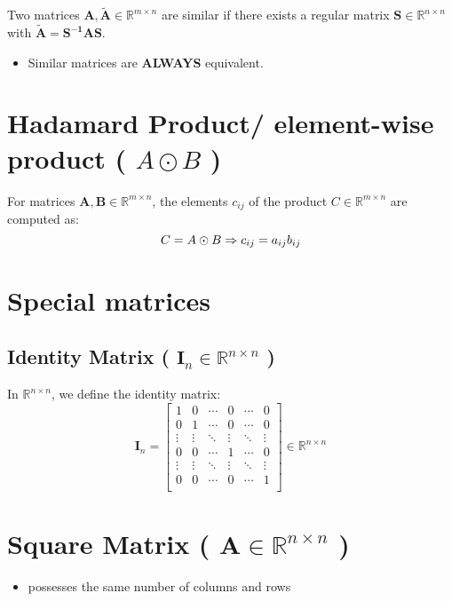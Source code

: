 Two matrices $\mathbf{A, \tilde{A}} \in \mathbb{R}^{m\times n}$ are similar if there exists a regular matrix $\mathbf{S} \in \mathbb{R}^{n\times n}$ with $\mathbf{\tilde{A} = S^{-1}AS}$.

\begin{itemize}
    \item Similar matrices are \textbf{ALWAYS} equivalent.
\end{itemize}


\section{Hadamard Product/ element-wise product ( $A \odot B$ )}\label{matrix: Hadamard Product/ element-wise product}

For matrices $\mathbf{A, B} \in \mathbb{R}^{m\times n}$, the elements $c_{ij}$ of the product $C \in \mathbb{R}^{m\times n}$ are computed as:
\[
    \hfill
    C = A \odot B	
    \Rightarrow	c_{ij} = a_{ij}b_{ij}
    \hfill
\]


\section{Special matrices}

\subsection{Identity Matrix ( $\mathbf{I}_n \in \mathbb{R}^{n\times n}$ ) \cite{mfml-1}}\label{Identity Matrix}
In $\mathbb{R}^{n\times n}$, we define the identity matrix:
\[
    \renewcommand{\arraystretch}{0.6}
    \mathbf{I}_n = \begin{bmatrix}
        1 & 0 & \cdots & 0 & \cdots & 0 \\
        0 & 1 & \cdots & 0 & \cdots & 0 \\
        \vdots & \vdots & \ddots & \vdots & \ddots & \vdots \\
        0 & 0 & \cdots & 1 & \cdots & 0 \\
        \vdots & \vdots & \ddots & \vdots & \ddots & \vdots \\
        0 & 0 & \cdots & 0 & \cdots & 1 \\
    \end{bmatrix} \in \mathbb{R}^{n\times n}
\]


\section{Square Matrix ( $\mathbf{A} \in \mathbb{R}^{n\times n}$ ) \cite{mfml-1}}\label{Square Matrix}
\begin{itemize}
    \item possesses the same number of columns and rows
\end{itemize}

